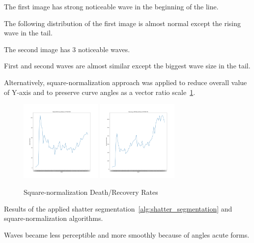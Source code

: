 The first image has strong noticeable wave in the beginning of the line.

The following distribution of the first image is almost normal except the rising wave in the tail.

The second image has 3 noticeable waves.

First and second waves are almost similar except the biggest wave size in the tail.


Alternatively, square-normalization approach was applied to reduce overall value of Y-axis and to preserve curve angles as a vector ratio scale~\ref{fig:normalized_segmentated_data}.

\begin{figure}[h]
    \includegraphics*[width=4cm, height=4cm]{../src/output/death-diff-sqrt-norm.png}
    \includegraphics*[width=4cm, height=4cm]{../src/output/recovery-diff-sqrt-norm.png}
    \caption{Square-normalization Death/Recovery Rates}
    \label{fig:normalized_segmentated_data}
\end{figure}

Results of the applied shatter segmentation~\ref{alg:shatter_segmentation} and square-normalization algorithms. %

Waves became less perceptible and more smoothly because of angles acute forms.




